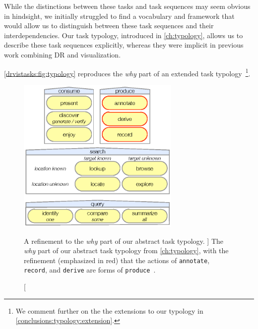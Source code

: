 While the distinctions between these tasks and task sequences may seem obvious in hindsight, we initially struggled to find a vocabulary and framework that would allow us to distinguish between these task sequences and their interdependencies.
Our task typology, introduced in \autoref{ch:typology}, allows us to describe these task sequences explicitly, whereas they were implicit in previous work combining \ac{DR} and visualization.

\autoref{drvistasks:fig:typology} reproduces the {\it why} part of an extended task typology~\cite{Munzner2014}\footnote{We comment further on the the extensions to our typology in \autoref{conclusions:typology:extension}.}.


\begin{figure}
	\centering
	\includegraphics[width=0.7\textwidth]{figures/typology-why.eps}
	\caption
	[
	    A refinement to the \textsl{why} part of our abstract task typology.
	]
	{
    	The \textsl{why} part of our abstract task typology from \autoref{ch:typology}, with the refinement (emphasized in red) that the actions of {\tt annotate}, {\tt record}, and {\tt derive} are forms of {\tt produce}~\cite{Munzner2014}.
    }
    \centering
	\label{drvistasks:fig:typology}
\end{figure} 


